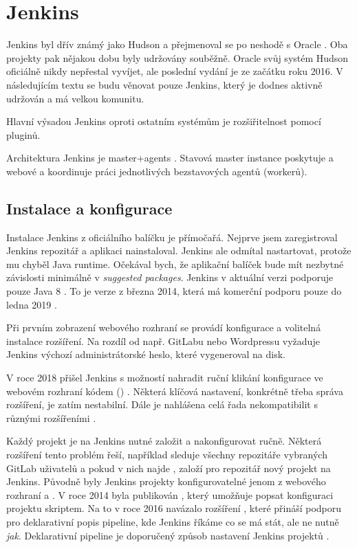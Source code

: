 \section{Jenkins}
\label{sec:jenkins}
    Jenkins byl dřív známý jako Hudson a přejmenoval se po neshodě s Oracle \cite{jenkins-hudson}. Oba projekty pak nějakou dobu byly udržovány souběžně. Oracle svůj systém Hudson oficiálně nikdy nepřestal vyvíjet, ale poslední vydání je ze začátku roku 2016. V následujícím textu se budu věnovat pouze Jenkins, který je dodnes aktivně udržován a má velkou komunitu.

    Hlavní výsadou Jenkins oproti ostatním \CICD systémům je rozšiřitelnost pomocí pluginů.
    \blind[1]

    Architektura Jenkins je master+agents \cite{jenkins-architecture}. Stavová master instance poskytuje  a webové  a koordinuje práci jednotlivých bezstavových agentů (workerů).

    \subsection{Instalace a konfigurace}
        Instalace Jenkins z oficiálního balíčku je přímočařá. Nejprve jsem zaregistroval Jenkins  repozitář  a aplikaci nainstaloval. Jenkins ale odmítal nastartovat, protože mu chyběl Java runtime. Očekával bych, že aplikační balíček bude mít nezbytné závislosti minimálně v \textit{suggested packages}. Jenkins v aktuální verzi podporuje pouze Java 8 \cite{jenkins-java}. To je  verze z března 2014, která má komerční podporu pouze do ledna 2019 \cite{oracle-eol}.

        Při prvním zobrazení webového rozhraní se provádí konfigurace a volitelná instalace rozšíření. Na rozdíl od např. GitLabu nebo Wordpressu vyžaduje Jenkins výchozí administrátorské heslo, které vygeneroval na disk.

        V roce 2018 přišel Jenkins s možností nahradit ruční klikání konfigurace ve webovém rozhraní kódem () \cite{jenkins-casc}. Některá klíčová nastavení, konkrétně třeba správa rozšíření, je zatím nestabilní. Dále je nahlášena celá řada nekompatibilit s různými rozšířeními .

        Každý projekt je na Jenkins nutné založit a nakonfigurovat ručně. Některá rozšíření tento problém řeší, například  \cite{jenkins-plugins-gbs} sleduje všechny repozitáře vybraných GitLab uživatelů a pokud v nich najde , založí pro repozitář nový projekt na Jenkins. Původně byly Jenkins projekty konfigurovatelné jenom z webového rozhraní a . V roce 2014 byla publikován , který umožňuje popsat konfiguraci projektu skriptem. Na to v roce 2016 navázalo rozšíření , které přináší podporu pro deklarativní popis pipeline, kde Jenkins říkáme co se má stát, ale ne nutně \textit{jak}. Deklarativní pipeline je doporučený způsob nastavení Jenkins projektů \cite{jenkins-best-practices}.

